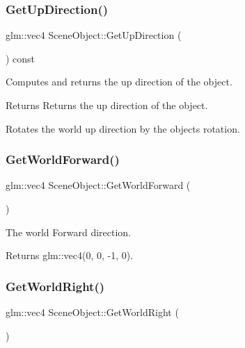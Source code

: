 \subsubsection{\texorpdfstring{Get\+Up\+Direction()}{GetUpDirection()}}
{\footnotesize\ttfamily glm\+::vec4 Scene\+Object\+::\+Get\+Up\+Direction (\begin{DoxyParamCaption}{ }\end{DoxyParamCaption}) const\hspace{0.3cm}{\ttfamily [virtual]}}



Computes and returns the up direction of the object.

\begin{DoxyReturn}{Returns}
Returns the up direction of the object.
\end{DoxyReturn}
Rotates the world up direction by the object\textquotesingle{}s rotation. \hypertarget{class_scene_object_a6fa71efda895933be4ee684745980e68}{}\label{class_scene_object_a6fa71efda895933be4ee684745980e68}
\subsubsection{\texorpdfstring{Get\+World\+Forward()}{GetWorldForward()}}
{\footnotesize\ttfamily glm\+::vec4 Scene\+Object\+::\+Get\+World\+Forward (\begin{DoxyParamCaption}{ }\end{DoxyParamCaption})\hspace{0.3cm}{\ttfamily [static]}}



The world \textquotesingle{}Forward\textquotesingle{} direction.

\begin{DoxyReturn}{Returns}
glm\+::vec4(0, 0, -\/1, 0).
\end{DoxyReturn}
\hypertarget{class_scene_object_a46d0ffed082f7bd515b9550ef9f9a86a}{}\label{class_scene_object_a46d0ffed082f7bd515b9550ef9f9a86a}
\subsubsection{\texorpdfstring{Get\+World\+Right()}{GetWorldRight()}}
{\footnotesize\ttfamily glm\+::vec4 Scene\+Object\+::\+Get\+World\+Right (\begin{DoxyParamCaption}{ }\end{DoxyParamCaption})\hspace{0.3cm}{\ttfamily [static]}}



